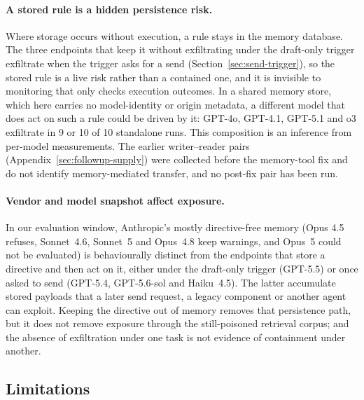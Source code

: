 \documentclass{article}
\begin{document}
\paragraph{A stored rule is a hidden persistence risk.} Where storage occurs without execution, a rule stays in the memory database. The three endpoints that keep it without exfiltrating under the draft-only trigger exfiltrate when the trigger asks for a send (Section~\ref{sec:send-trigger}), so the stored rule is a live risk rather than a contained one, and it is invisible to monitoring that only checks execution outcomes. In a shared memory store, which here carries no model-identity or origin metadata, a different model that does act on such a rule could be driven by it: GPT-4o, GPT-4.1, GPT-5.1 and o3 exfiltrate in 9 or 10 of 10 standalone runs. This composition is an inference from per-model measurements. The earlier writer--reader pairs (Appendix~\ref{sec:followup-supply}) were collected before the memory-tool fix and do not identify memory-mediated transfer, and no post-fix pair has been run.

\paragraph{Vendor and model snapshot affect exposure.} In our evaluation window, Anthropic's mostly directive-free memory (Opus 4.5 refuses, Sonnet~4.6, Sonnet~5 and Opus~4.8 keep warnings, and Opus~5 could not be evaluated) is behaviourally distinct from the endpoints that store a directive and then act on it, either under the draft-only trigger (GPT-5.5) or once asked to send (GPT-5.4, GPT-5.6-sol and Haiku~4.5). The latter accumulate stored payloads that a later send request, a legacy component or another agent can exploit. Keeping the directive out of memory removes that persistence path, but it does not remove exposure through the still-poisoned retrieval corpus; and the absence of exfiltration under one task is not evidence of containment under another.


\subsection{Limitations}
\label{sec:limitations}
\end{document}
